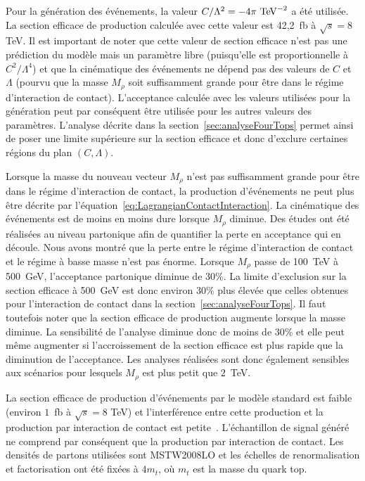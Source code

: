 Pour la g\'en\'eration des \'ev\'enements, la valeur $C/\Lambda^2=-4\pi\TeV^{-2}$ a \'et\'e utilis\'ee. La section efficace de production calcul\'ee avec cette valeur est 42,2~fb \`a $\sqrt{s}=8~$TeV. Il est important de noter que cette valeur de section efficace n'est pas une pr\'ediction du mod\`ele mais un param\`etre libre (puisqu'elle est proportionnelle \`a $C^2/\Lambda^4$) et que la cin\'ematique des \'ev\'enements ne d\'epend pas des valeurs de $C$ et $\Lambda$ (pourvu que la masse $M_\rho$ soit suffisamment grande pour \^etre dans le r\'egime d'interaction de contact). L'acceptance calcul\'ee avec les valeurs utilis\'ees pour la g\'en\'eration peut par cons\'equent \^etre utilis\'ee pour les autres valeurs des param\`etres. L'analyse d\'ecrite dans la section~\ref{sec:analyseFourTops} permet ainsi de poser une limite sup\'erieure sur la section efficace et donc d'exclure certaines r\'egions du plan $\left(C,\Lambda\right)$. 

Lorsque la masse du nouveau vecteur $M_\rho$ n'est pas suffisamment grande pour \^etre dans le r\'egime d'interaction de contact, la production d'\'ev\'enements \fourtop{} ne peut plus \^etre d\'ecrite par l'\'equation~\ref{eq:LagrangianContactInteraction}. La cin\'ematique des \'ev\'enements est de moins en moins dure lorsque $M_\rho$ diminue. Des \'etudes ont \'et\'e r\'ealis\'ees au niveau partonique afin de quantifier la perte en acceptance qui en d\'ecoule. Nous avons montr\'e que la perte entre le r\'egime d'interaction de contact et le r\'egime \`a basse masse n'est pas \'enorme. Lorsque $M_\rho$ passe de 100~TeV \`a 500~GeV, l'acceptance partonique diminue de 30\%. La limite d'exclusion sur la section efficace \`a 500~GeV est donc environ 30\% plus \'elev\'ee que celles obtenues pour l'interaction de contact dans la section~\ref{sec:analyseFourTops}. Il faut toutefois noter que la section efficace de production augmente lorsque la masse diminue. La sensibilit\'e de l'analyse diminue donc de moins de 30\% et elle peut m\^eme augmenter si l'accroissement de la section efficace est plus rapide que la diminution de l'acceptance. Les analyses r\'ealis\'ees sont donc \'egalement sensibles aux sc\'enarios pour lesquels $M_\rho$ est plus petit que $2$~TeV. 

La section efficace de production d'\'ev\'enements \fourtop{} par le mod\`ele standard est faible (environ $1$~fb \`a $\sqrt{s}=8$ TeV) et l'interf\'erence entre cette production et la production par interaction de contact est petite~\cite{Degrande:2010kt}. L'\'echantillon de signal g\'en\'er\'e ne comprend par cons\'equent que la production par interaction de contact. Les densités de partons utilis\'ees sont MSTW2008LO et les \'echelles de renormalisation et factorisation ont \'et\'e fix\'ees \`a $4m_t$, o\`u $m_t$ est la masse du quark top. 

